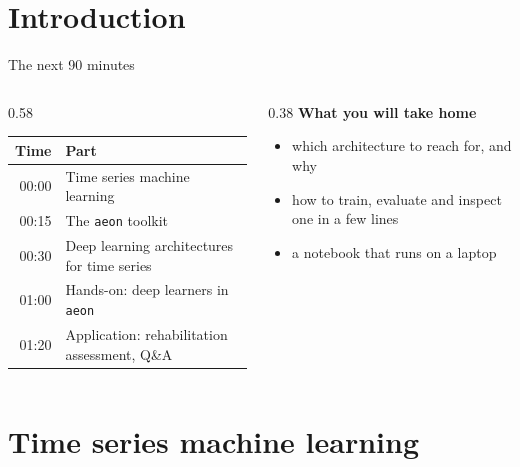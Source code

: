 \documentclass[aspectratio=169,10pt]{beamer}
\begin{document}
\section{Introduction}

\begin{frame}{The next 90 minutes}
  \begin{columns}[t]
    \begin{column}{0.58\textwidth}
      \begin{tabular}{@{}rl@{}}
        \toprule
        \textbf{Time} & \textbf{Part} \\
        \midrule
        00:00 & Time series machine learning \\
        00:15 & The \texttt{aeon} toolkit \\
        00:30 & Deep learning architectures for time series \\
        01:00 & Hands-on: deep learners in \texttt{aeon} \\
        01:20 & Application: rehabilitation assessment, Q\&A \\
        \bottomrule
      \end{tabular}
    \end{column}
    \begin{column}{0.38\textwidth}
      \textbf{What you will take home}
      \begin{itemize}
        \item which architecture to reach for, and why
        \item how to train, evaluate and inspect one in a few lines
        \item a notebook that runs on a laptop
      \end{itemize}
    \end{column}
  \end{columns}
  \vfill
\end{frame}

\section{Time series machine learning}
\end{document}

